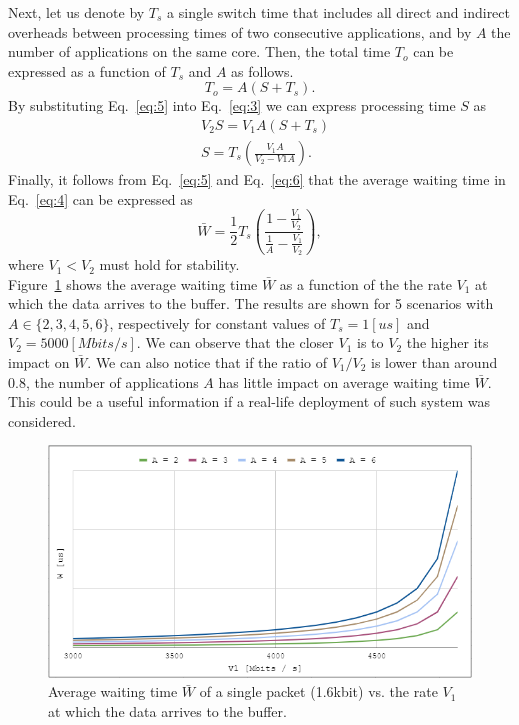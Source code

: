\documentclass[english]{kththesis}
\begin{document}
Next, let us denote by \(T_s\) a single switch time that includes all direct and indirect overheads between processing times of two consecutive applications, and by \(A\) the number of applications on the same core. Then, the total time \(T_o\) can be expressed as a function of \(T_s\) and \(A\) as follows.
\begin{equation}
\label{eq:5}
T_o = A (S + T_s).
\end{equation}
By substituting Eq.~\ref{eq:5} into Eq.~\ref{eq:3} we can express processing time \(S\) as
\begin{equation}
\label{eq:6}
\begin{split}
& V_2S = V_1A\left(S + T_s\right)\\
& S = T_s \left(\frac{V_1 A}{V_2 - V1 A}\right).
\end{split}
\end{equation}
Finally, it follows from Eq.~\ref{eq:5} and Eq.~\ref{eq:6} that the average waiting time in Eq.~\ref{eq:4} can be expressed as
\begin{equation}
\label{eq:8}
\bar{W}
    = \frac{1}{2}T_s\left(\frac{1 - \frac{V_1}{V_2}}{\frac{1}{A} - \frac{V_1}{V_2}}\right),
\end{equation}
where \(V_1 < V_2\) must hold for stability.\\
Figure~\ref{fig:avgwt} shows the average waiting time \(\bar{W}\) as a function of the the rate \(V_1\) at which the data arrives to the buffer. The results are shown for 5 scenarios with \(A \in \{2,3,4,5,6\}\), respectively for constant values of \(T_s = 1 [us]\) and \(V_2 = 5000 [Mbits/s]\). We can observe that the closer \(V_1\) is to  \(V_2\) the higher its impact on \(\bar{W}\). We can also notice that if the ratio of \(V_1/V_2\) is lower than around 0.8, the number of applications \(A\) has little impact on average waiting time \(\bar{W}\). This could be a useful information if a real-life deployment of such system was considered.
\begin{figure}[!ht]
  \centering
    \includegraphics[width=1\textwidth]{Fig12}
  \caption{Average waiting time \(\bar{W}\) of a single packet (1.6kbit) vs. the rate \(V_1\) at which the data arrives to the buffer.}
  \label{fig:avgwt}
\end{figure}
\end{document}

